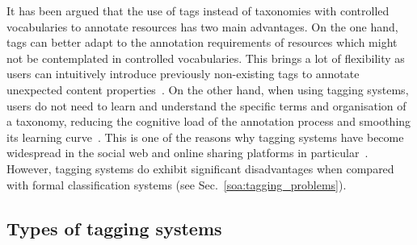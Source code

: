 It has been argued that the use of tags instead of taxonomies with controlled vocabularies to annotate resources has two main advantages.
On the one hand, tags can better adapt to the annotation requirements of resources which might not be contemplated in controlled vocabularies. This brings a lot of flexibility as users can intuitively introduce previously non-existing tags to annotate unexpected content properties~\citep{Mathes2004,shirky2005ontology,Quintarelli2005,halpin2006,Sen,Fichter2006,Wu2006,Macgregor2004}.
On the other hand, when using tagging systems, users do not need to learn and understand the specific terms and organisation of a taxonomy, reducing the cognitive load of the annotation process and smoothing its learning curve~\citep{Quintarelli2005,shirky2005ontology,Fichter2006}. This is one of the reasons why tagging systems have become widespread in the social web and online sharing platforms in particular~\citep{Cattuto2006}.
However, tagging systems do exhibit significant disadvantages when compared with formal classification systems (see Sec.~\ref{soa:tagging_problems}). 


 
\subsection{Types of tagging systems}
 
